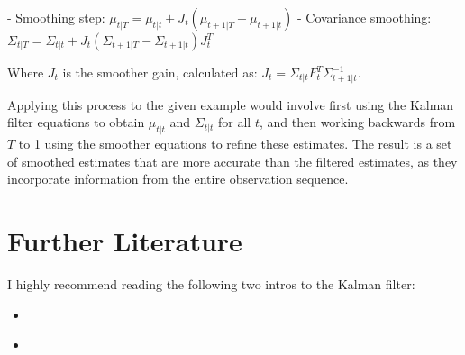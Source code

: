 \documentclass{article}
\begin{document}
- Smoothing step: \( \mu_{t|T} = \mu_{t|t} + J_t(\mu_{t+1|T} - \mu_{t+1|t}) \)
- Covariance smoothing: \( \Sigma_{t|T} = \Sigma_{t|t} + J_t(\Sigma_{t+1|T} - \Sigma_{t+1|t})J_t^T \)

Where \( J_t \) is the smoother gain, calculated as:
\( J_t = \Sigma_{t|t}F_{t}^T\Sigma_{t+1|t}^{-1} \).

Applying this process to the given example would involve first using the Kalman filter equations to obtain \(\mu_{t|t}\) and \(\Sigma_{t|t}\) for all \(t\), and then working backwards from \(T\) to 1 using the smoother equations to refine these estimates. The result is a set of smoothed estimates that are more accurate than the filtered estimates, as they incorporate information from the entire observation sequence.


\section{Further Literature}
I highly recommend reading the following two intros to the Kalman filter:
\begin{itemize}
    \item \cite{lacey_tutorial_nodate}
    \item \cite{welch_introduction_nodate}
\end{itemize}


\printbibliography
\end{document}
